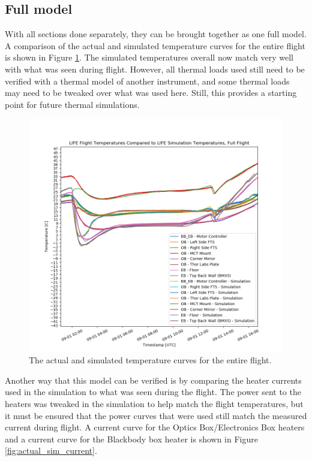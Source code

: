 \subsection{Full model}\label{full_temp_model}
With all sections done separately, they can be brought together as one full model. A comparison of the actual and simulated temperature curves for the entire flight is shown in Figure \ref{fig:full_flight_temps_with_sim}. The simulated temperatures overall now match very well with what was seen during flight. However, all thermal loads used still need to be verified with a thermal model of another instrument, and some thermal loads may need to be tweaked over what was used here. Still, this provides a starting point for future thermal simulations.

\begin{figure}
    \centering
    \includegraphics[width=\textwidth]{chap4_images/full_flight_with_sim_temps.png}
    \caption{The actual and simulated temperature curves for the entire flight.}
    \label{fig:full_flight_temps_with_sim}
\end{figure}

Another way that this model can be verified is by comparing the heater currents used in the simulation to what was seen during the flight. The power sent to the heaters was tweaked in the simulation to help match the flight temperatures, but it must be ensured that the power curves that were used still match the measured current during flight. A current curve for the Optics Box/Electronics Box heaters and a current curve for the Blackbody box heater is shown in Figure \ref{fig:actual_sim_current}.

